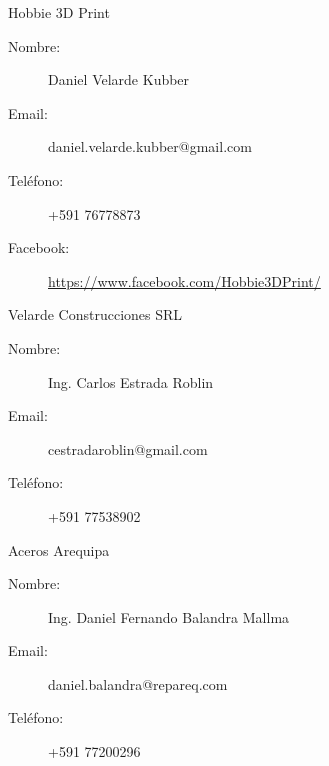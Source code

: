 \documentclass[a4paper,10pt]{article}
\begin{document}
\begin{thebibliography}{}

 Hobbie 3D Print
  \begin{description}
    \item[Nombre:] Daniel Velarde Kubber
    \item[Email:] daniel.velarde.kubber@gmail.com
    \item[Teléfono:] +591 76778873
    \item[Facebook:] \url{https://www.facebook.com/Hobbie3DPrint/}
  \end{description}

 Velarde Construcciones SRL
  \begin{description}
    \item[Nombre:] Ing. Carlos Estrada Roblin
    \item[Email:] cestradaroblin@gmail.com
    \item[Teléfono:] +591 77538902
  \end{description}

 Aceros Arequipa
  \begin{description}
    \item[Nombre:] Ing. Daniel Fernando Balandra Mallma
    \item[Email:] daniel.balandra@repareq.com
    \item[Teléfono:] +591 77200296
  \end{description}

\end{thebibliography}
\end{document}
